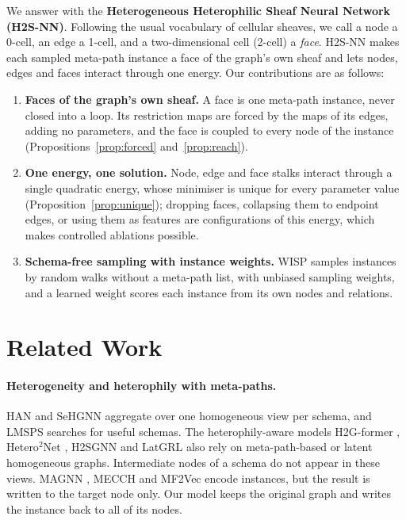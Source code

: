 \documentclass{article}
\newcommand{\method}{\textsc{H2S-NN}}
\newcommand{\wisp}{\textsc{WISP}}
\begin{document}
We answer with the \textbf{Heterogeneous Heterophilic Sheaf Neural Network (\method{})}. Following the usual vocabulary of cellular sheaves, we call a node a 0-cell, an edge a 1-cell, and a two-dimensional cell (2-cell) a \emph{face}. \method{} makes each sampled meta-path instance a face of the graph's own sheaf and lets nodes, edges and faces interact through one energy. Our contributions are as follows:
\begin{enumerate}
  \item \textbf{Faces of the graph's own sheaf.} A face is one meta-path instance, never closed into a loop. Its restriction maps are forced by the maps of its edges, adding no parameters, and the face is coupled to every node of the instance (Propositions~\ref{prop:forced} and~\ref{prop:reach}).
  \item \textbf{One energy, one solution.} Node, edge and face stalks interact through a single quadratic energy, whose minimiser is unique for every parameter value (Proposition~\ref{prop:unique}); dropping faces, collapsing them to endpoint edges, or using them as features are configurations of this energy, which makes controlled ablations possible.
  \item \textbf{Schema-free sampling with instance weights.} \wisp{} samples instances by random walks without a meta-path list, with unbiased sampling weights, and a learned weight scores each instance from its own nodes and relations.
\end{enumerate}

\section{Related Work}
\label{sec:related}

\paragraph{Heterogeneity and heterophily with meta-paths.} HAN \cite{wang2019han} and SeHGNN \cite{yang2023sehgnn} aggregate over one homogeneous view per schema, and LMSPS \cite{li2024lmsps} searches for useful schemas. The heterophily-aware models H2G-former \cite{lin2025heterophily}, Hetero$^2$Net \cite{li2025hetero2net}, H2SGNN \cite{lu2026addressing} and LatGRL \cite{shen2025heterophily} also rely on meta-path-based or latent homogeneous graphs. Intermediate nodes of a schema do not appear in these views. MAGNN \cite{fu2020magnn}, MECCH \cite{fu2024mecch} and MF2Vec \cite{kim2024mf2vec} encode instances, but the result is written to the target node only. Our model keeps the original graph and writes the instance back to all of its nodes.
\end{document}
